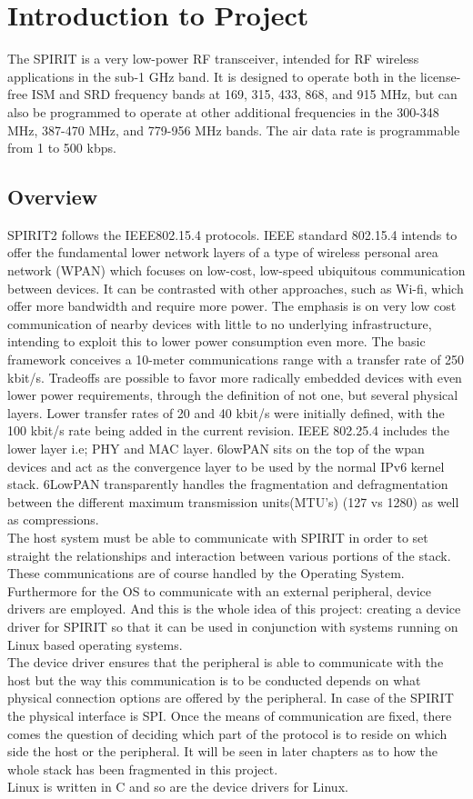 \chapter{Introduction to Project}
The SPIRIT is a very low-power RF transceiver, intended for RF wireless applications in the sub-1 GHz band. It is designed to operate both in the license-free ISM and SRD frequency bands at 169, 315, 433, 868, and 915 MHz, but can also be programmed to operate at other additional frequencies in the 300-348 MHz, 387-470 MHz, and 779-956 MHz bands. The air data rate is programmable from 1 to 500 kbps. 
\section{Overview} 
\noindent SPIRIT2 follows the IEEE802.15.4 protocols. IEEE standard 802.15.4 intends to offer the fundamental lower network layers of a type of wireless personal area network (WPAN) which focuses on low-cost, low-speed ubiquitous communication between devices. It can be contrasted with other approaches, such as Wi-fi, which offer more bandwidth and require more power. The emphasis is on very low cost communication of nearby devices with little to no underlying infrastructure, intending to exploit this to lower power consumption even more. The basic framework conceives a 10-meter communications range with a transfer rate of 250 kbit/s. Tradeoffs are possible to favor more radically embedded devices with even lower power requirements, through the definition of not one, but several physical layers. Lower transfer rates of 20 and 40 kbit/s were initially defined, with the 100 kbit/s rate being added in the current revision. IEEE 802.25.4 includes the lower layer i.e; PHY and MAC layer. 6lowPAN sits on the top of the wpan devices and act as the convergence layer to be used by the normal IPv6 kernel stack. 6LowPAN transparently handles the fragmentation and defragmentation between the different maximum transmission units(MTU’s) (127 vs 1280) as well as compressions.\\
\noindent The host system must be able to communicate with SPIRIT in order to set straight the relationships and interaction between various portions of the stack. These communications are of course handled by the Operating System. Furthermore for the OS to communicate with an external peripheral, device drivers are employed. And this is the whole idea of this project: creating a device driver for SPIRIT so that it can be used in conjunction with systems running on Linux based operating systems.\\
\noindent The device driver ensures that the peripheral is able to communicate with the host but the way this communication is to be conducted depends on what physical connection options are offered by the peripheral. In case of the SPIRIT the physical interface is SPI. Once the means of communication are fixed, there comes the question of deciding which part of the protocol is to reside on which side the host or the peripheral. It will be seen in later chapters as to how the whole stack has been fragmented in this project.\\
\noindent Linux is written in C and so are the device drivers for Linux. 
